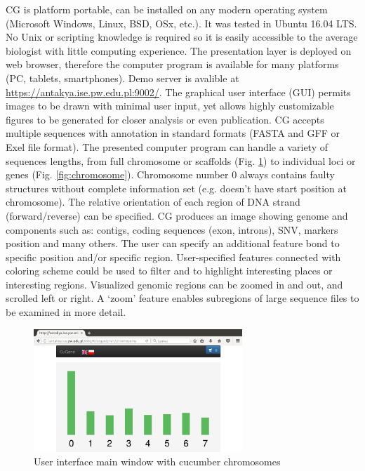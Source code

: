 \documentclass[a4paper]{spie}
\newcommand{\appShortcut}{CG}
\begin{document}
\appShortcut{} is platform portable, can be installed on any modern operating system (Microsoft Windows, Linux, BSD, OSx, etc.).
It was tested in Ubuntu 16.04 LTS.
No Unix or scripting knowledge is required so it is easily accessible to the average biologist with little computing experience.
The presentation layer is deployed on web browser, therefore the computer program is available for many platforms (PC, tablets, smartphones).
Demo server is avalible at \url{https://antakya.ise.pw.edu.pl:9002/}.
The graphical user interface (GUI) permits images to be drawn with minimal user input,
yet allows highly customizable figures to be generated for closer analysis or even publication.
\appShortcut{} accepts multiple sequences with annotation in standard formats (FASTA and GFF or Exel file format).
The presented computer program can handle a variety of sequences lengths, from full chromosome or scaffolds  (Fig. \ref{fig:organism})
to individual loci or genes (Fig. \ref{fig:chromosome}). Chromosome number 0 always contains faulty structures without complete information set (e.g. doesn't have start position at chromosome).
The relative orientation of each region of DNA strand (forward/reverse) can be specified.
\appShortcut{} produces an image showing genome and components such as: contigs, coding sequences (exon, introns), SNV, markers position and many others.
The user can specify an additional feature bond to specific position and/or specific region.
User-specified features connected with coloring scheme could be used to filter and to highlight interesting places or interesting regions.
Visualized genomic regions can be zoomed in and out, and scrolled left or right.
A ‘zoom’ feature enables subregions of large sequence files to be examined in more detail.

\begin{figure}[htp]
  \centering
  \includegraphics[width=0.7\textwidth]{img/chromosomy.png}
  \caption{User interface main window with cucumber chromosomes}
  \label{fig:organism}
\end{figure}
\end{document}
